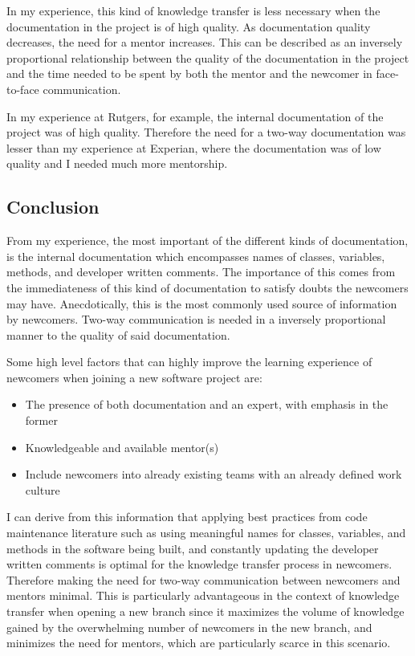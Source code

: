 \documentclass[12pt, letterpaper]{article}
\begin{document}
In my experience, this kind of knowledge transfer is less necessary when the documentation in the project is of high
quality. As documentation quality decreases, the need for a mentor increases. This can be described
as an inversely proportional relationship between the quality of the documentation in the project and the 
time needed to be spent by both the mentor and the newcomer in face-to-face communication.

In my experience at Rutgers, for example, the internal documentation of the project was of high quality. Therefore
the need for a two-way documentation was lesser than my experience at Experian, where the documentation was of low quality and 
I needed much more mentorship.

\subsection{Conclusion}

From my experience, the most 
important of the different kinds of documentation, is the internal documentation which encompasses
names of classes, variables, methods, and developer written comments. The importance of this comes from
the immediateness of this kind of documentation to satisfy doubts the newcomers may have.
Anecdotically, this is the most commonly used source of information by newcomers. 
Two-way communication is needed in a inversely 
proportional manner to the quality of said documentation.

Some high level factors that can highly improve the learning experience of newcomers when joining a new software 
project are:
\begin{itemize}
  \item The presence of both documentation and an expert, with emphasis in the former
  \item Knowledgeable and available mentor(s)
  \item Include newcomers into already existing teams with an already defined work culture 
\end{itemize}

I can derive from this information that applying best practices from code maintenance literature such as 
using meaningful names for classes, variables, and methods in the software being built, and constantly updating
the developer written comments is optimal for the knowledge transfer process in newcomers. Therefore making
the need for two-way communication between newcomers and mentors minimal. This is 
particularly advantageous in the context of knowledge transfer when opening a new 
branch since it maximizes the volume of knowledge gained by the overwhelming number of 
newcomers in the new branch,
and minimizes the need for mentors, which are particularly scarce in this scenario.



 
\end{document}

